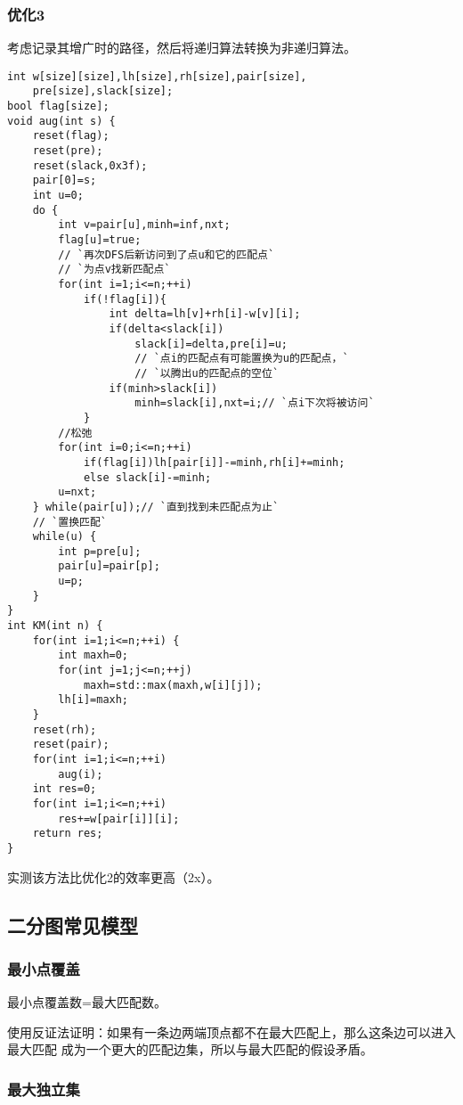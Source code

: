 \subsubsection{优化3}
考虑记录其增广时的路径，然后将递归算法转换为非递归算法。
\begin{lstlisting}
int w[size][size],lh[size],rh[size],pair[size],
    pre[size],slack[size];
bool flag[size];
void aug(int s) {
    reset(flag);
    reset(pre);
    reset(slack,0x3f);
    pair[0]=s;
    int u=0;
    do {
        int v=pair[u],minh=inf,nxt;
        flag[u]=true;
        // `再次DFS后新访问到了点u和它的匹配点`
        // `为点v找新匹配点`
        for(int i=1;i<=n;++i)
            if(!flag[i]){
                int delta=lh[v]+rh[i]-w[v][i];
                if(delta<slack[i])
                    slack[i]=delta,pre[i]=u;
                    // `点i的匹配点有可能置换为u的匹配点，`
                    // `以腾出u的匹配点的空位`
                if(minh>slack[i])
                    minh=slack[i],nxt=i;// `点i下次将被访问`
            }
        //松弛
        for(int i=0;i<=n;++i)
            if(flag[i])lh[pair[i]]-=minh,rh[i]+=minh;
            else slack[i]-=minh;
        u=nxt;
    } while(pair[u]);// `直到找到未匹配点为止`
    // `置换匹配`
    while(u) {
        int p=pre[u];
        pair[u]=pair[p];
        u=p;
    }
}
int KM(int n) {
    for(int i=1;i<=n;++i) {
        int maxh=0;
        for(int j=1;j<=n;++j)
            maxh=std::max(maxh,w[i][j]);
        lh[i]=maxh;
    }
    reset(rh);
    reset(pair);
    for(int i=1;i<=n;++i)
        aug(i);
    int res=0;
    for(int i=1;i<=n;++i)
        res+=w[pair[i]][i];
    return res;
}
\end{lstlisting}
实测该方法比优化2的效率更高（2x）。
\subsection{二分图常见模型}
\subsubsection{最小点覆盖}
\begin{theorem}
	最小点覆盖数=最大匹配数。
\end{theorem}

使用反证法证明：如果有一条边两端顶点都不在最大匹配上，那么这条边可以进入最大匹配
成为一个更大的匹配边集，所以与最大匹配的假设矛盾。

\subsubsection{最大独立集}

